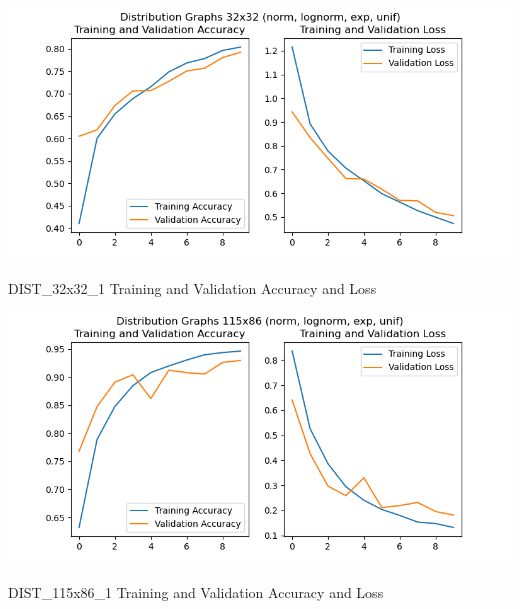 \documentclass[12pt]{article}
\begin{document}
            \begin{table}
            
                \begin{center}

                    \includegraphics[scale=0.6]{DIST_32x32_1_HIST_RESULTS.png}
                    \caption{DIST\_32x32\_1 Training and Validation Accuracy and Loss}
                    \label{dist-32-32-val-loss}
        
                \end{center}
                
        
            
                \begin{center}

                    \includegraphics[scale=0.6]{DIST_115x86_1_HIST_RESULTS.png}
                    \caption{DIST\_115x86\_1 Training and Validation Accuracy and Loss}
                    \label{dist-115-86-val-loss}
        
                \end{center}

            
                \begin{center}


\end{center}
\end{table}
\end{document}
